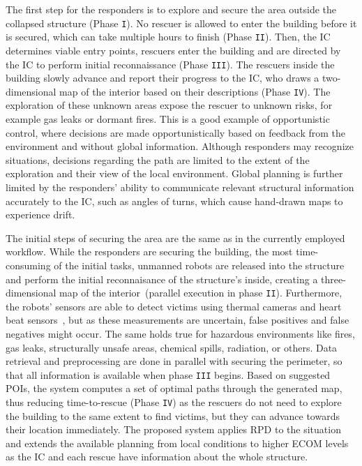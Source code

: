 \documentclass{egpubl}
\begin{document}
 The first step for the responders is to explore and secure the area outside the collapsed structure (Phase \texttt{I}). No rescuer is allowed to enter the building before it is secured, which can take multiple hours to finish (Phase \texttt{II}). Then, the IC determines viable entry points, rescuers enter the building and are directed by the IC to perform initial reconnaissance (Phase \texttt{III}). The rescuers inside the building slowly advance and report their progress to the IC, who draws a two-dimensional map of the interior based on their descriptions (Phase \texttt{IV}). The exploration of these unknown areas expose the rescuer to unknown risks, for example gas leaks or dormant fires. This is a good example of opportunistic control, where decisions are made opportunistically based on feedback from the environment and without global information. Although responders may recognize situations, decisions regarding the path are limited to the extent of the exploration and their view of the local environment. Global planning is further limited by the responders' ability to communicate relevant structural information accurately to the IC, such as angles of turns, which cause hand-drawn maps to experience drift.

 The initial steps of securing the area are the same as in the currently employed workflow. While the responders are securing the building, the most time-consuming of the initial tasks, unmanned robots are released into the structure and perform the initial reconnaisance of the structure's inside, creating a three-dimensional map of the interior~(parallel execution in phase \texttt{II}). Furthermore, the robots' sensors are able to detect victims using thermal cameras and heart beat sensors~\cite{6027084, Wu12Eulerian}, but as these measurements are uncertain, false positives and false negatives might occur. The same holds true for hazardous environments like fires, gas leaks, structurally unsafe areas, chemical spills, radiation, or others. Data retrieval and preprocessing are done in parallel with securing the perimeter, so that all information is available when phase \texttt{III} begins. Based on suggested POIs, the system computes a set of optimal paths through the generated map, thus reducing time-to-rescue (Phase \texttt{IV}) as the rescuers do not need to explore the building to the same extent to find victims, but they can advance towards their location immediately. The proposed system applies RPD to the situation and extends the available planning from local conditions to higher ECOM levels as the IC and each rescue have information about the whole structure.
\end{document}
